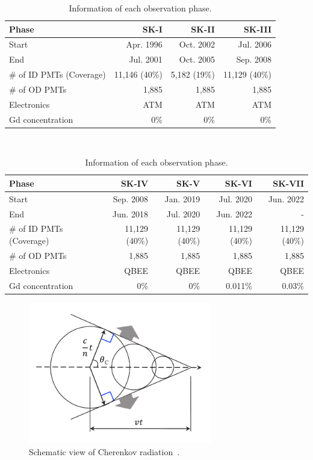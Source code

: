 \begin{table}[h]
	\caption[Information of each observation phase]{\label{002_Tab:phase} Information of each observation phase.}
	\centering
	\vs
	\begin{tabular}{lrrr}
		\hline\hline
		Phase&SK-I&SK-II&SK-III\\
		\hline
		Start&Apr. 1996&Oct. 2002&Jul. 2006\\
		End&Jul. 2001&Oct. 2005&Sep. 2008\\
		\# of ID PMTs (Coverage)&11,146 (40\%)&5,182 (19\%)&11,129 (40\%)\\
		\# of OD PMTs&1,885&1,885&1,885\\
		Electronics&ATM&ATM&ATM\\
		Gd concentration&0\%&0\%&0\%\\
		\hline\hline
	\end{tabular}
	\\
	\vs
	\begin{tabular}{lrrrr}
		\hline\hline
		Phase&SK-IV&SK-V&SK-VI&SK-VII\\
		\hline
		Start&Sep. 2008&Jan. 2019&Jul. 2020&Jun. 2022\\
		End&Jun. 2018&Jul. 2020&Jun. 2022&-\\
		\# of ID PMTs (Coverage)&11,129 (40\%)&11,129 (40\%)&11,129 (40\%)&11,129 (40\%)\\
		\# of OD PMTs&1,885&1,885&1,885&1,885\\
		Electronics&QBEE&QBEE&QBEE&QBEE\\
		Gd concentration&0\%&0\%&0.011\%&0.03\%\\
		\hline\hline
	\end{tabular}
\end{table}

\begin{figure}[tbp]
	\centering
	\includegraphics[width=8cm]{Figures/002/F10_Cherenkov}
	\caption[Schematic view of Cherenkov radiation]{\label{002_F10_Cherenkov} Schematic view of Cherenkov radiation~\cite{2015Yamamoto}.}
\end{figure}

